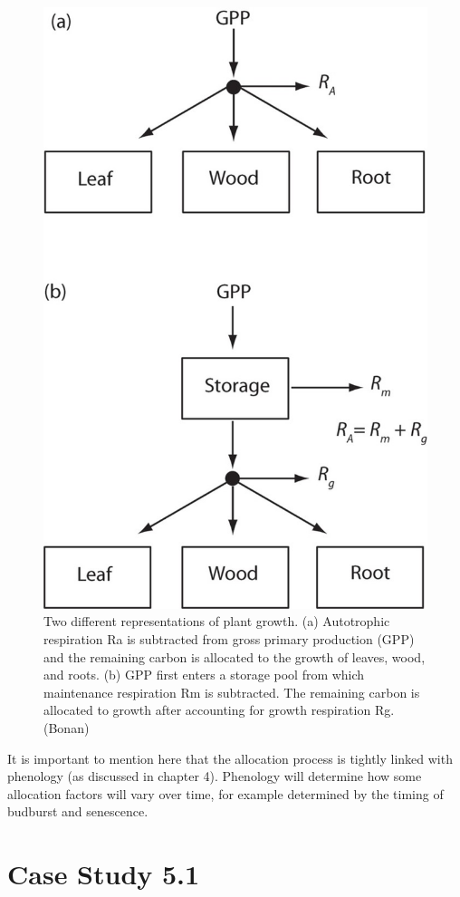 \documentclass[12pt,oneside]{book}
\begin{document}
\begin{figure}

{\centering \includegraphics[width=0.8\linewidth]{figures/chap5/f59_storage_pool} 

}

\caption{Two different representations of plant growth. (a) Autotrophic respiration Ra is subtracted from gross primary production (GPP) and the remaining carbon is allocated to the growth of leaves, wood, and roots. (b) GPP first enters a storage pool from which maintenance respiration Rm is subtracted. The remaining carbon is allocated to growth after accounting for growth respiration Rg.(Bonan)}\label{fig:f59}
\end{figure}

It is important to mention here that the allocation process is tightly
linked with phenology (as discussed in chapter 4). Phenology will
determine how some allocation factors will vary over time, for example
determined by the timing of budburst and senescence.

\section{Case Study 5.1}\label{case-study-5.1}
\end{document}
